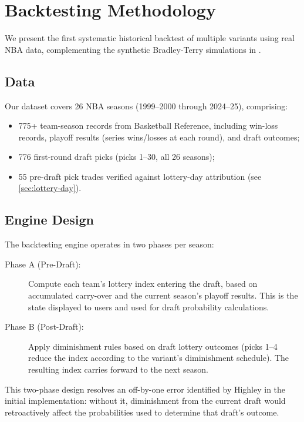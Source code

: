 \section{Backtesting Methodology}
\label{sec:backtesting}


We present the first systematic historical backtest of multiple \cola{} variants using real NBA data, complementing the synthetic Bradley-Terry simulations in \citet{highley2026cola}.

\subsection{Data}

Our dataset covers 26 NBA seasons (1999--2000 through 2024--25), comprising:
\begin{itemize}
    \item 775+ team-season records from Basketball Reference, including win-loss records, playoff results (series wins/losses at each round), and draft outcomes;
    \item 776 first-round draft picks (picks 1--30, all 26 seasons);
    \item 55 pre-draft pick trades verified against lottery-day attribution (see \cref{sec:lottery-day}).
\end{itemize}

\subsection{Engine Design}

The \cola{} backtesting engine operates in two phases per season:

\begin{description}
    \item[Phase A (Pre-Draft):] Compute each team's lottery index entering the draft, based on accumulated carry-over and the current season's playoff results. This is the state displayed to users and used for draft probability calculations.
    \item[Phase B (Post-Draft):] Apply diminishment rules based on draft lottery outcomes (picks 1--4 reduce the index according to the variant's diminishment schedule). The resulting index carries forward to the next season.
\end{description}

This two-phase design resolves an off-by-one error identified by Highley in the initial implementation: without it, diminishment from the current draft would retroactively affect the probabilities used to determine that draft's outcome.

